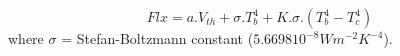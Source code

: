 \[
Flx =  a.V_{th} + \sigma.T_b^4 + K.\sigma.(T_b^4 - T_c^4)
\]
where $\sigma$ = Stefan-Boltzmann constant ($5.6698 10^{-8} W m^{-2} K^{-4}$).
